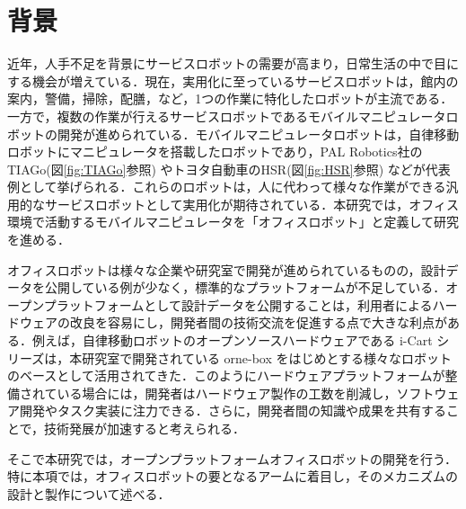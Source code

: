 
\section{背景}
近年，人手不足を背景にサービスロボットの需要が高まり，日常生活の中で目にする機会が増えている．現在，実用化に至っているサービスロボットは，館内の案内\cite{AYUDA:online}，警備\cite{SQ-2:online}，掃除\cite{KLEENBOT:online}，配膳\cite{BellaBot:online}，など，1つの作業に特化したロボットが主流である．一方で，複数の作業が行えるサービスロボットであるモバイルマニピュレータロボットの開発が進められている．モバイルマニピュレータロボットは，自律移動ロボットにマニピュレータを搭載したロボットであり，PAL Robotics社のTIAGo(図\ref{fig:TIAGo}参照) やトヨタ自動車のHSR(図\ref{fig:HSR}参照) などが代表例として挙げられる．これらのロボットは，人に代わって様々な作業ができる汎用的なサービスロボットとして実用化が期待されている\cite{古賀達也201937_707}．本研究では，オフィス環境で活動するモバイルマニピュレータを「オフィスロボット」と定義して研究を進める．

オフィスロボットは様々な企業や研究室で開発が進められているものの，設計データを公開している例が少なく，標準的なプラットフォームが不足している．オープンプラットフォームとして設計データを公開することは，利用者によるハードウェアの改良を容易にし，開発者間の技術交流を促進する点で大きな利点がある．例えば，自律移動ロボットのオープンソースハードウェアである i-Cart シリーズは，本研究室で開発されている orne-box をはじめとする様々なロボットのベースとして活用されてきた．このようにハードウェアプラットフォームが整備されている場合には，開発者はハードウェア製作の工数を削減し，ソフトウェア開発やタスク実装に注力できる．さらに，開発者間の知識や成果を共有することで，技術発展が加速すると考えられる．

そこで本研究では，オープンプラットフォームオフィスロボットの開発を行う．特に本項では，オフィスロボットの要となるアームに着目し，そのメカニズムの設計と製作について述べる．


